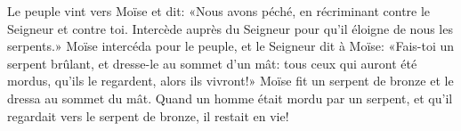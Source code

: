 Le peuple vint vers Moïse et dit:
	«Nous avons péché, en récriminant contre le Seigneur et contre toi.
	Intercède auprès du Seigneur pour qu’il éloigne de nous les serpents.»
Moïse intercéda pour le peuple, et le Seigneur dit à Moïse:
	«Fais-toi un serpent brûlant, et dresse-le au sommet d’un mât:
	tous ceux qui auront été mordus, qu’ils le regardent, alors ils vivront!»
Moïse fit un serpent de bronze et le dressa au sommet du mât.
Quand un homme était mordu par un serpent,
	et qu’il regardait vers le serpent de bronze,
	il restait en vie!
